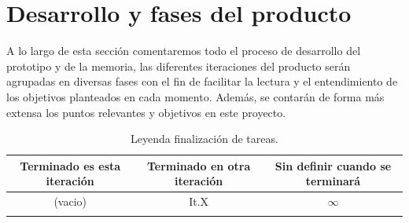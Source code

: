 \chapter{Desarrollo y fases del producto}
A lo largo de esta sección comentaremos todo el proceso de desarrollo del prototipo y de la 
memoria, las diferentes iteraciones del producto serán agrupadas en diversas fases con el fin
de facilitar la lectura y el entendimiento de los objetivos planteados en cada momento. Además,
se contarán de forma más extensa los puntos relevantes y objetivos en este proyecto.

\begin{longtable}[c]{|c|c|c|}
\hline
Terminado es esta iteración & Terminado en otra iteración & Sin definir cuando se terminará \\ 
\hline
			(vacio)			&             It.X            &             $\infty$            \\ 
\hline
\caption{Leyenda finalización de tareas.}
\end{longtable}

